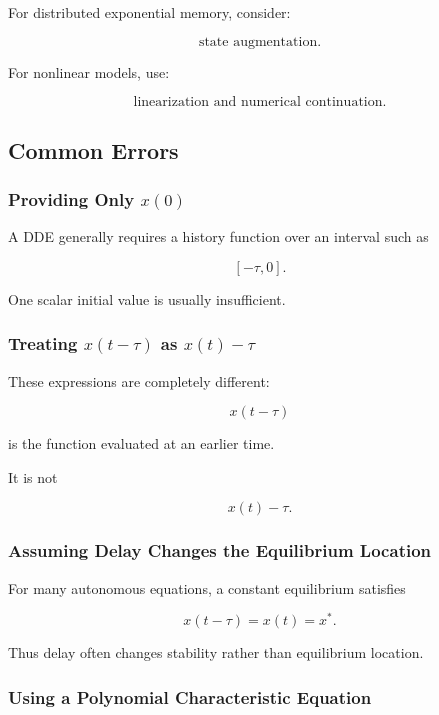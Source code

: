 For distributed exponential memory, consider:

\[
\boxed{
\text{state augmentation}.
}
\]

For nonlinear models, use:

\[
\boxed{
\text{linearization and numerical continuation}.
}
\]

\subsection{Common Errors}
\label{subsec:dde-common-errors}

\subsubsection{Providing Only \(x(0)\)}

A DDE generally requires a history function over an interval such as

\[
[-\tau,0].
\]

One scalar initial value is usually insufficient.

\subsubsection{Treating \(x(t-\tau)\) as \(x(t)-\tau\)}

These expressions are completely different:

\[
\boxed{
x(t-\tau)
}
\]

is the function evaluated at an earlier time.

It is not

\[
\boxed{
x(t)-\tau.
}
\]

\subsubsection{Assuming Delay Changes the Equilibrium Location}

For many autonomous equations, a constant equilibrium satisfies

\[
x(t-\tau)=x(t)=x^*.
\]

Thus delay often changes stability rather than equilibrium location.

\subsubsection{Using a Polynomial Characteristic Equation}


